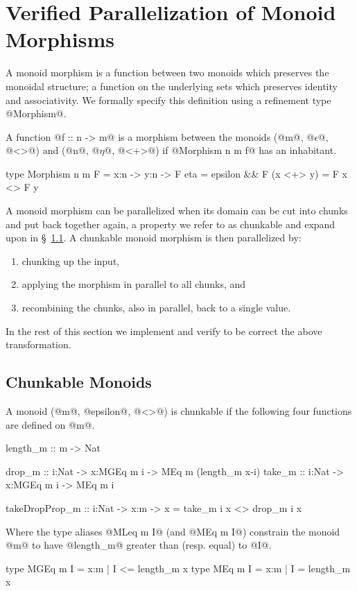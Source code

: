 \section{Verified Parallelization of Monoid Morphisms}\label{sec:parallelization}

A monoid morphism is a function between two monoids which
preserves the monoidal structure; \ie a function on the underlying
sets which preserves identity and associativity. We formally specify
this definition using a refinement type @Morphism@.
%
\begin{definition}\label{definition:morphism}
A function @f :: n -> m@ is a morphism
between the monoids
(@m@, @$\epsilon$@, @<>@)
and (@n@, @$\eta$@, @<+>@)
if @Morphism n m f@ has an inhabitant.
\begin{code}
type Morphism n m F =
  x:n -> y:n -> {F eta = epsilon && F (x <+> y) = F x <> F y}
\end{code}
\end{definition}

A monoid morphism can be parallelized when its domain can be cut into
chunks and put back together again, a property we refer to as
chunkable and expand upon in \S~\ref{subsec:chunkable}. A
chunkable monoid morphism is then parallelized by:
\begin{enumerate}
  \item chunking up the input,
  \item applying the morphism in parallel to all chunks, and
  \item recombining the chunks, also in parallel, back to a single value.
\end{enumerate}
In the rest of this section we implement and verify to be correct the above
transformation.

\subsection{Chunkable Monoids}\label{subsec:chunkable}
\begin{definition}\label{definition:chunkable}
A monoid (@m@, @epsilon@, @<>@) is chunkable
if the following four functions are defined on @m@.
\begin{code}
length_m :: m -> Nat

drop_m :: i:Nat -> x:MGEq m i -> MEq m (length_m x-i)
take_m :: i:Nat -> x:MGEq m i -> MEq m i

takeDropProp_m :: i:Nat -> x:m ->
                  {x = take_m i x <> drop_m i x}
\end{code}

Where the type aliases @MLeq m I@ (and @MEq m I@)
constrain the monoid @m@ to have @length_m@
greater than (resp. equal) to @I@.
\begin{code}
type MGEq m I = {x:m | I <= length_m x }
type MEq  m I = {x:m | I = length_m x }
\end{code}
\end{definition}

